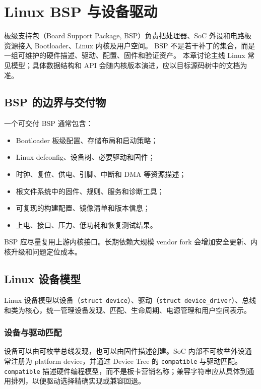 \chapter{Linux BSP 与设备驱动}
\label{chap:linux-bsp}

板级支持包（Board Support Package, BSP）负责把处理器、SoC 外设和电路板资源接入 Bootloader、Linux 内核及用户空间。
BSP 不是若干补丁的集合，而是一组可维护的硬件描述、驱动、配置、固件和验证资产。
本章讨论主线 Linux 常见模型；具体数据结构和 API 会随内核版本演进，应以目标源码树中的文档为准\cite{linux-driver-api}。

\section{BSP 的边界与交付物}

一个可交付 BSP 通常包含：
\begin{itemize}
  \item Bootloader 板级配置、存储布局和启动策略；
  \item Linux defconfig、设备树、必要驱动和固件；
  \item 时钟、复位、供电、引脚、中断和 DMA 等资源描述；
  \item 根文件系统中的固件、规则、服务和诊断工具；
  \item 可复现的构建配置、镜像清单和版本信息；
  \item 上电、接口、压力、低功耗和恢复测试结果。
\end{itemize}

BSP 应尽量复用上游内核接口。长期依赖大规模 vendor fork 会增加安全更新、内核升级和问题定位成本。

\section{Linux 设备模型}

Linux 设备模型以设备（\texttt{struct device}）、驱动（\texttt{struct device\_driver}）、总线和类为核心，统一管理设备发现、匹配、生命周期、电源管理和用户空间表示。

\subsection{设备与驱动匹配}

设备可以由可枚举总线发现，也可以由固件描述创建。SoC 内部不可枚举外设通常注册为 platform device，并通过 Device Tree 的 \texttt{compatible} 与驱动匹配。
\texttt{compatible} 描述硬件编程模型，而不是板卡营销名称；兼容字符串应从具体到通用排列，以便驱动选择精确实现或兼容回退。


